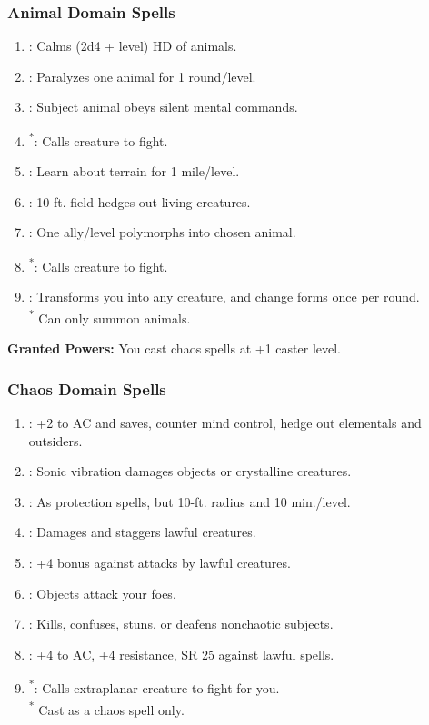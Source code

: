 \subsubsection{Animal Domain Spells}
\begin{enumerate}
	\item{:} Calms (2d4 + level) HD of animals.
	\item{:} Paralyzes one animal for 1 round/level.
	\item{:} Subject animal obeys silent mental commands.
	\item{\textsuperscript{*}:} Calls creature to fight.
	\item{:} Learn about terrain for 1 mile/level.
	\item{:} 10-ft. field hedges out living creatures.
	\item{:} One ally/level polymorphs into chosen animal.
	\item{\textsuperscript{*}:} Calls creature to fight.
	\item{:} Transforms you into any creature, and change forms once per round.
	\\ \textsuperscript{*} Can only summon animals.
\end{enumerate}

\textbf{Granted Powers:} You cast chaos spells at +1 caster level.
\subsubsection{Chaos Domain Spells}
\begin{enumerate}
	\item{:} +2 to AC and saves, counter mind control, hedge out elementals and outsiders.
	\item{:} Sonic vibration damages objects or crystalline creatures.
	\item{:} As protection spells, but 10-ft. radius and 10 min./level.
	\item{:} Damages and staggers lawful creatures.
	\item{:} +4 bonus against attacks by lawful creatures.
	\item{:} Objects attack your foes.
	\item{:} Kills, confuses, stuns, or deafens nonchaotic subjects.
	\item{:} +4 to AC, +4 resistance, SR 25 against lawful spells.
	\item{\textsuperscript{*}:} Calls extraplanar creature to fight for you.
	\\ \textsuperscript{*} Cast as a chaos spell only.
\end{enumerate}

